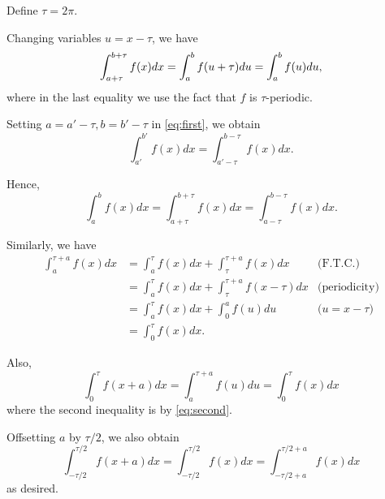 \documentclass[oneside]{article}
\begin{document}
Define $\tau = 2\pi$.

Changing variables $u = x - \tau$, we have\begin{equation}
  \label{eq:first}
  \int_{a+\tau}^{b+\tau}f(x)dx
  = \int_{a}^{b}f(u + \tau)du \\
  = \int_{a}^{b}f(u)du\text,
\end{equation} where in the last equality we use the fact that $f$ is
$\tau$-periodic.

Setting $a = a' - \tau, b = b' - \tau$ in \eqref{eq:first}, we obtain\[
  \int_{a'}^{b'}f(x)dx = \int_{a' - \tau}^{b - \tau}f(x)dx \text{.}
\]

Hence, \[
  \int_{a}^{b}f(x)dx
  = \int_{a + \tau}^{b + \tau}f(x)dx
  = \int_{a - \tau}^{b - \tau}f(x)dx \text{.}
\]

Similarly, we have \begin{align}
  \int_{a}^{\tau + a} f(x) dx
  &= \int_{a}^{\tau} f(x) dx + \int_{\tau}^{\tau + a} f(x) dx
  & \text{(F.T.C.)} \nonumber \\
  &= \int_{a}^{\tau} f(x) dx + \int_{\tau}^{\tau + a} f(x - \tau) dx
  & \text{(periodicity)} \nonumber \\
  &= \int_{a}^{\tau} f(x) dx + \int_{0}^{a} f(u) du
  & \text{($u = x - \tau$)} \nonumber \\
  &= \int_{0}^{\tau} f(x) dx \text{.} \label{eq:second}
\end{align}

Also, \[
  \int_{0}^{\tau}f(x + a)dx = \int_{a}^{\tau + a}f(u)du = \int_0^\tau f(x)dx
\] where the second inequality is by \eqref{eq:second}.

Offsetting $a$ by $\tau/2$, we also obtain\[
  \int_{-\tau/2}^{\tau/2}f(x+a)dx = \int_{-\tau/2}^{\tau/2}f(x)dx
  = \int_{-\tau/2+a}^{\tau/2+a}f(x)dx
\] as desired.
\end{document}
